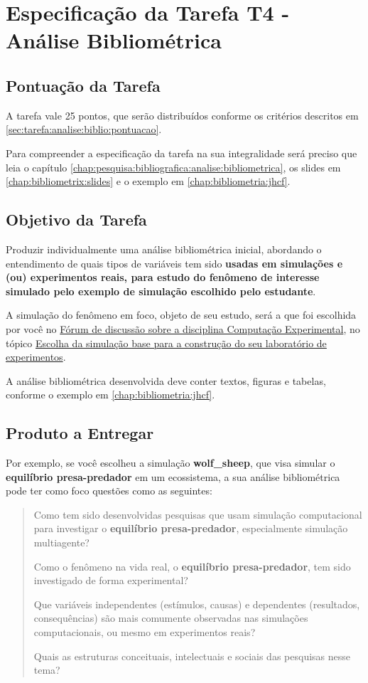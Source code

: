\chapter{Especificação da Tarefa T4 - Análise Bibliométrica\label{chap:tarefa:analise:bibliometrica}}

\section{Pontuação da Tarefa}

A tarefa vale 25 pontos, que serão distribuídos conforme os critérios descritos em \ref{sec:tarefa:analise:biblio:pontuacao}.

Para compreender a especificação da tarefa na sua integralidade será preciso que leia o capítulo \ref{chap:pesquisa:bibliografica:analise:bibliometrica}, os slides em  \ref{chap:bibliometrix:slides} e o exemplo em \ref{chap:bibliometria:jhcf}.

\section{Objetivo da Tarefa}

Produzir individualmente uma análise bibliométrica inicial, abordando o entendimento de quais tipos de variáveis tem sido \textbf{usadas em simulações e (ou) experimentos reais, para estudo do fenômeno de interesse simulado pelo exemplo de simulação escolhido pelo estudante}.

A simulação do fenômeno em foco, objeto de seu estudo, será a que foi escolhida por você no \href{https://aprender3.unb.br/mod/forum/view.php?id=769097}{Fórum de discussão sobre a disciplina Computação Experimental}, no tópico \href{https://aprender3.unb.br/mod/forum/discuss.php?d=217110}{Escolha da simulação base para a construção do seu laboratório de experimentos}. 

A análise bibliométrica desenvolvida deve conter textos, figuras e tabelas, conforme o exemplo em \ref{chap:bibliometria:jhcf}.

\section{Produto a Entregar}

Por exemplo, se você escolheu a simulação \textbf{wolf\_sheep}, que visa simular o \textbf{equilíbrio presa-predador} em um ecossistema, a sua análise bibliométrica pode ter como foco questões como as seguintes:
\begin{quote}
    Como tem sido desenvolvidas pesquisas que usam simulação computacional para investigar o \textbf{equilíbrio presa-predador}, especialmente simulação multiagente?
    
    Como o fenômeno na vida real, o \textbf{equilíbrio presa-predador}, tem sido investigado de forma experimental?

    Que variáveis independentes (estímulos, causas) e dependentes (resultados, consequências) são mais comumente observadas nas simulações computacionais, ou mesmo em experimentos reais? 
    

    Quais as estruturas conceituais, intelectuais e sociais das pesquisas nesse tema?
\end{quote}

